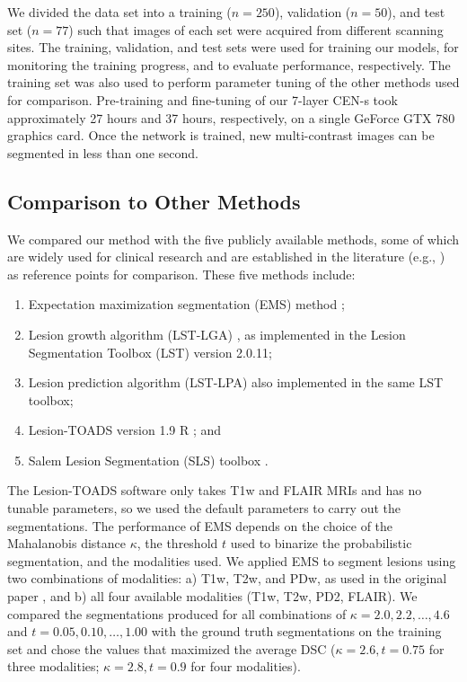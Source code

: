 We divided the data set into a training ($n=250$), validation ($n=50$), and test
set ($n=77$) such that images of each set were acquired from different scanning
sites. The training, validation, and test sets were used for training our
models, for monitoring the training progress, and to evaluate performance,
respectively. The training set was also used to perform parameter tuning of the
other methods used for comparison. Pre-training and fine-tuning of our 7-layer
CEN-s took approximately 27 hours and 37 hours, respectively, on a single
GeForce GTX 780 graphics card. Once the network is trained, new multi-contrast
images can be segmented in less than one second.

\subsection[Comparison to other methods]{Comparison to Other Methods}
\label{sec:othermethods}

We compared our method with the five publicly available methods, some of which
are widely used for clinical research and are established in the literature
(e.g., \citealp{sudre2015,subbanna2015,guizard2015}) as reference points for
comparison. These five methods include:
\begin{enumerate}
\item Expectation maximization segmentation (EMS) method \citep{vanleemput2001};
\item Lesion growth algorithm (LST-LGA) \citep{schmidt2012automated}, as
implemented in the Lesion Segmentation Toolbox (LST) version 2.0.11;
\item Lesion prediction algorithm (LST-LPA) also implemented in the same LST toolbox;
\item Lesion-TOADS version 1.9 R \citep{shiee2010topology}; and 
\item Salem Lesion Segmentation (SLS) toolbox \citep{roura2015}.
\end{enumerate}
The Lesion-TOADS software only takes T1w and FLAIR MRIs and has no tunable
parameters, so we used the default parameters to carry out the segmentations.
The performance of EMS depends on the choice of the Mahalanobis distance
$\kappa$, the threshold $t$ used to binarize the probabilistic segmentation, and
the modalities used. We applied EMS to segment lesions using two combinations of
modalities: a) T1w, T2w, and PDw, as used in the original paper
\citep{vanleemput2001}, and b) all four available modalities (T1w, T2w, PD2,
FLAIR). We compared the segmentations produced for all combinations of $\kappa =
2.0, 2.2, \dotsc, 4.6$ and $t = 0.05, 0.10, \dotsc, 1.00$ with the ground truth
segmentations on the training set and chose the values that maximized the
average DSC ($\kappa = 2.6, t = 0.75$ for three modalities; $\kappa = 2.8, t =
0.9$ for four modalities).

